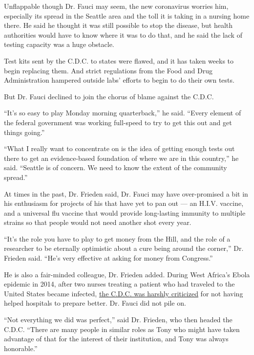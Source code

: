 Unflappable though Dr. Fauci may seem, the new coronavirus worries him,
especially its spread in the Seattle area and the toll it is taking in a
nursing home there. He said he thought it was still possible to stop the
disease, but health authorities would have to know where it was to do
that, and he said the lack of testing capacity was a huge obstacle.

Test kits sent by the C.D.C. to states were flawed, and it has taken
weeks to begin replacing them. And strict regulations from the Food and
Drug Administration hampered outside labs' efforts to begin to do their
own tests.

But Dr. Fauci declined to join the chorus of blame against the C.D.C.

``It's so easy to play Monday morning quarterback,'' he said. ``Every
element of the federal government was working full-speed to try to get
this out and get things going.''

``What I really want to concentrate on is the idea of getting enough
tests out there to get an evidence-based foundation of where we are in
this country,'' he said. ``Seattle is of concern. We need to know the
extent of the community spread.''

At times in the past, Dr. Frieden said, Dr. Fauci may have over-promised
a bit in his enthusiasm for projects of his that have yet to pan out ---
an H.I.V. vaccine, and a universal flu vaccine that would provide
long-lasting immunity to multiple strains so that people would not need
another shot every year.

``It's the role you have to play to get money from the Hill, and the
role of a researcher to be eternally optimistic about a cure being
around the corner,'' Dr. Frieden said. ``He's very effective at asking
for money from Congress.''

He is also a fair-minded colleague, Dr. Frieden added. During West
Africa's Ebola epidemic in 2014, after two nurses treating a patient who
had traveled to the United States became infected,
\href{https://www.nytimes3xbfgragh.onion/2014/10/15/us/cdc-says-it-should-have-responded-more-quickly-to-dallas-ebola-case.html}{the
C.D.C. was harshly criticized} for not having helped hospitals to
prepare better. Dr. Fauci did not pile on.

``Not everything we did was perfect,'' said Dr. Frieden, who then headed
the C.D.C. ``There are many people in similar roles as Tony who might
have taken advantage of that for the interest of their institution, and
Tony was always honorable.''

